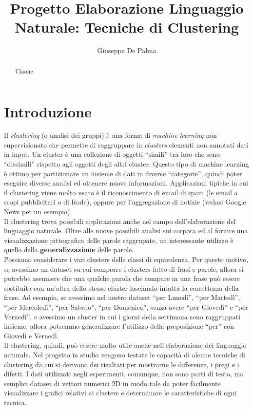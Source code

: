 \documentclass[12pt]{llncs}
\author{Giuseppe De Palma}
\title{Progetto Elaborazione Linguaggio Naturale: Tecniche di Clustering}
\institute{Alma Mater Studiorum - Università di Bologna \\
	\email{giuseppe.depalma@studio.unibo.it}\\
	\email{Matricola: 854846}
}
\newcommand{\acapo}{\vspace{0.5\baselineskip}\\}
\begin{document}
    \maketitle
	
	\begin{abstract}
		Ciaone
	\end{abstract}
	   
	\section{Introduzione}
	Il \textit{clustering} (o analisi dei gruppi) è una forma di \textit{machine learning} non supervisionato che permette di raggruppare in \textit{clusters} elementi non annotati
	dati in input. Un cluster è una collezione di oggetti ``simili'' tra loro che sono ``dissimili'' rispetto agli oggetti degli altri cluster. Questo tipo di machine learning è
	ottimo per partizionare un insieme di dati in diverse ``categorie'', quindi poter eseguire diverse analisi ed ottenere nuove informazioni.
	Applicazioni tipiche in cui il clustering viene molto usato è il riconoscimento di email di spam (le email a scopi pubblicitari o di frode), oppure per l'aggregazione di notizie (vedasi Google News per un esempio).
	\acapo
	Il clustering trova possibili applicazioni anche nel campo dell'elaborazione del linguaggio naturale. Oltre alle nuove possibili analisi
	sui corpora ed al fornire una visualizzazione pittografica delle parole raggrupate, un interessante utilizzo è quello della \textbf{generalizzazione} delle parole.
	\acapo 
	Possiamo considerare i vari clusters delle classi di equivalenza. Per questo motivo, se avessimo un dataset su cui comporre i clusters fatto di frasi e parole, allora si potrebbe assumere che una
	qualche parola che compare in una frase può essere sostituita con un'altra dello stesso cluster lasciando intatta la correttezza della frase. 
	Ad esempio, se avessimo nel nostro dataset ``per Lunedì'', ``per Martedì'', ``per Mercoledì'', ``per Sabato'', ``per Domenica'', senza avere ``per Giovedì'' e ``per Vernedì'', e avessimo un cluster in cui 
	i giorni della settimana sono raggruppati insieme, allora potremmo generalizzare l'utilizzo della preposizione ``per'' con Giovedì e Vernedì.
	\acapo
	Il clustering, quindi, può essere molto utile anche nell'elaborazione del linguaggio naturale. Nel progetto in studio vengono testate le capacità di alcune tecniche di clustering
	da cui si derivano dei risultati per mostrarne le differenze, i pregi e i difetti. I dati utilizzati negli esperimenti, comunque, non sono parti di testo, ma semplici dataset di vettori numerici 2D in modo tale da poter facilmente 
	visualizzare i grafici relativi ai clusters e determinare le caratteristiche di ogni tecnica.
\end{document}
